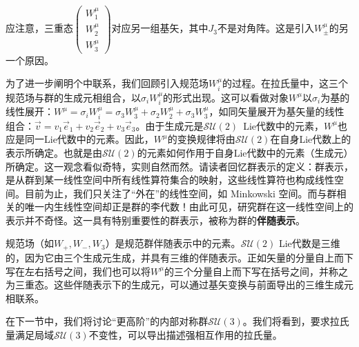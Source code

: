 应注意，三重态$\begin{pmatrix} W^\mu_1 \\ W^\mu_2 \\ W^\mu_3\end{pmatrix}$对应另一组基矢，其中$J_3$不是对角阵。这是引入$W_{\pm}^\mu$的另一个原因。

为了进一步阐明个中联系，我们回顾引入规范场$W^\mu_i$的过程。在拉氏量中，这三个规范场与群的生成元相组合，以$\sigma_iW_i^\mu$的形式出现。这可以看做对象$W^\mu$以$\sigma_i$为基的线性展开：$W^\mu=\sigma_iW_i^\mu=\sigma_3W_3^\mu+\sigma_2W_2^\mu+\sigma_3W_3^\mu$，如同矢量展开为基矢量的线性组合：$\vec{v}=v_1\vec{e}_1+v_2\vec{e}_2+v_3\vec{e}_3$。由于生成元是$\mathcal{SU}(2)$\, Lie代数中的元素，$W^\mu$也应是同一Lie代数中的元素。因此，$W^\mu$的变换规律将由$\mathcal{SU}(2)$在自身Lie代数上的表示所确定。也就是由$\mathcal{SU}(2)$的元素如何作用于自身Lie代数中的元素（生成元）所确定。这一观念看似奇特，实则自然而然。请读者回忆群表示的定义：群表示，是从群到某一线性空间中所有线性算符集合的映射，这些线性算符也构成线性空间。目前为止，我们只关注了“外在”的线性空间，如 Minkowski 空间。而与群相关的唯一内生线性空间却正是群的李代数！由此可见，研究群在这一线性空间上的表示并不奇怪。这一具有特别重要性的群表示，被称为群的{\bf 伴随表示}。

规范场（如$W_+,W_-,W_3$）是规范群伴随表示中的元素。$\mathcal{SU}(2)$ Lie代数是三维的，因为它由三个生成元生成，并具有三维的伴随表示。正如矢量的分量自上而下写在左右括号之间，我们也可以将$W^\mu$的三个分量自上而下写在括号之间，并称之为三重态。这些伴随表示下的生成元，可以通过基矢变换与前面导出的三维生成元相联系。

在下一节中，我们将讨论“更高阶”的内部对称群$\mathcal{SU}(3)$。我们将看到，要求拉氏量满足局域$\mathcal{SU}(3)$不变性，可以导出描述强相互作用的拉氏量。

